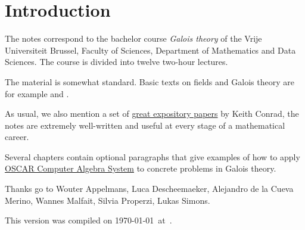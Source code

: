\section*{Introduction}

The notes correspond to the bachelor 
course \emph{Galois theory} of the 
Vrije Universiteit Brussel, 
Faculty of Sciences, 
Department of Mathematics and Data Sciences. The course
is divided into twelve two-hour lectures. 

The material is somewhat standard. Basic texts on fields and Galois theory 
are for example \cite{MR1645586} and 
\cite{MR3379917}. 

As usual, we also mention a set of 
\href{https://kconrad.math.uconn.edu/blurbs/}{great expository papers} by 
Keith Conrad, the notes are extremely well-written and useful  
at every stage of a mathematical career. 

Several chapters contain optional paragraphs that give examples of 
how to apply \href{https://oscar.computeralgebra.de/}{OSCAR Computer Algebra System}
to concrete problems in Galois theory. 

 
Thanks go to Wouter Appelmans, Luca Descheemaeker, 
Alejandro de la Cueva Merino, 
Wannes Malfait, Silvia Properzi, 
Lukas Simons. 


This version 
was compiled on \today~at~\currenttime.
